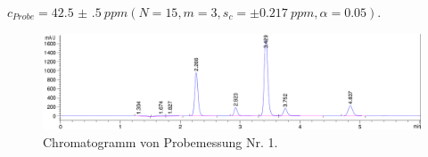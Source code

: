     \noindent $c_{Probe} = \SI[mode=text, multi-part-units = brackets, separate-uncertainty]{42.5(5)}{ppm} \left(N = 15, m = 3, s_c = \pm \SI[mode=text]{0.217}{ppm}, \alpha = 0.05\right)$.
      
      \begin{figure}[H]
        \includegraphics[scale=0.28, center]{images/Probemessung1.png} 
        \caption[Chromatogramm von Probemessung Nr. 1, Quelle: Autor]{Chromatogramm von Probemessung Nr. 1.}
        \label{fig:ChromatogrammProbemessung}
      \end{figure}
    
    
   
    
      